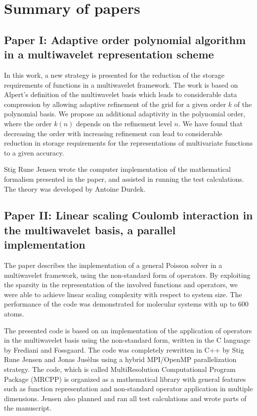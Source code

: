 \chapter{Summary of papers}
\section{Paper I: Adaptive order polynomial algorithm in a multiwavelet representation scheme}
In this work, a new strategy is presented for the reduction of the storage requirements of
functions in a multiwavelet framework. The work is based on Alpert's\cite{Alpert:1993p5460} definition
of the multiwavelet basis which leads to considerable data compression by allowing adaptive 
refinement of the grid for a given order $k$ of the polynomial basis. We propose an additional 
adaptivity in the polynomial order, where the order $k(n)$ depends on the refinement level $n$.
We have found that decreasing the order with increasing refinement can lead to considerable
reduction in storage requirements for the representations of multivariate functions to a given 
accuracy.  

Stig Rune Jensen wrote the computer implementation of the mathematical formalism presented in the 
paper, and assisted in running the test calculations. The theory was developed by Antoine Durdek.

\pagebreak

\section{Paper II: Linear scaling Coulomb interaction in the multiwavelet basis, a parallel implementation}
The paper describes the implementation of a general Poisson solver in a multiwavelet framework,
using the non-standard form of operators. By exploiting the sparsity in the representation of the
involved functions and operators, we were able to achieve linear scaling complexity with respect 
to system size. The performance of the code was demonstrated for molecular systems with up to
600 atoms. 

The presented code is based on an implementation of the application of operators in the multiwavelet
basis using the non-standard form, written in the C language by Frediani and 
Fossgaard\cite{Frediani:2013p1143}.
The code was completely rewritten in C++ by Stig Rune Jensen and Jonas Jus\`{e}lus using a hybrid 
MPI/OpenMP parallelization strategy. The code, which is called MultiResolution Computational Program 
Package (MRCPP) is organized as a mathematical library with general features such as function 
representation and non-standard operator application in multiple dimensions. Jensen also planned and 
ran all test calculations and wrote parts of the manuscript.

